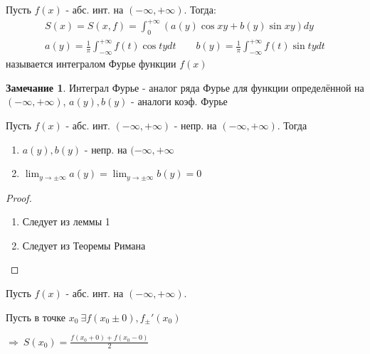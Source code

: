 \documentclass{article}
\theoremstyle{definition}
\numberwithin{theorem}{section}
\numberwithin{lemma}{section}
\numberwithin{definition}{section}
\numberwithin{corollary}{section}
\newtheorem*{remark}{Замечание}
\numberwithin{equation}{section}
\let\implies\Rightarrow
\begin{document}
\begin{definition}
  Пусть $f(x)$ - абс. инт. на $(-\infty,+\infty)$. Тогда:
  \begin{gather*}
    S(x)=S(x,f)=\int_{0}^{+\infty}(a(y)\cos xy+ b(y) \sin xy)dy \\ 
    a(y)=\frac{1}{\pi}\int_{-\infty}^{+\infty}f(t)\cos ty dt \qquad
    b(y)=\frac{1}{\pi}\int_{-\infty}^{+\infty}f(t)\sin ty dt
  \end{gather*}
  называется интегралом Фурье функции $f(x)$
\end{definition}
\begin{remark}
  Интеграл Фурье - аналог ряда Фурье для функции определённой на $(-\infty,+\infty)$,
  $a(y),b(y)$ - аналоги коэф. Фурье
\end{remark}
\begin{lemma}
  Пусть $f(x)$ - абс. инт. $(-\infty,+\infty)$ - непр. на $(-\infty,+\infty)$. Тогда
  \begin{enumerate}
    \item $a(y),b(y)$ - непр. на $(-\infty,+\infty$
    \item $\lim_{y\to \pm\infty} a(y)=\lim_{y\to \pm\infty} b(y) = 0$
  \end{enumerate}
\end{lemma}
\begin{proof}
  \phantom{.}

  \begin{enumerate}
    \item Следует из леммы 1 
    \item Следует из Теоремы Римана
  \end{enumerate}
\end{proof}
\begin{theorem}
  Пусть $f(x)$ - абс. инт. на $(-\infty,+\infty)$.

  Пусть в точке $x_0 \ \exists f(x_0\pm 0), f_{\pm}'(x_0)$

  $\implies \ S(x_0)=\frac{f(x_0+0)+f(x_0-0)}{2}$
\end{theorem}
\end{document}

